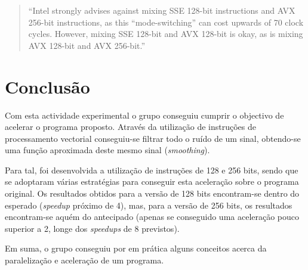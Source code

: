 \documentclass[a4paper]{article}
\begin{document}
	 \begin{quote}
	  ``Intel strongly advises against mixing SSE 128-bit instructions and AVX 256-bit instructions, as this ``mode-switching'' can cost upwards of 70 clock cycles. However, mixing SSE 128-bit and AVX 128-bit is okay, as is mixing AVX 128-bit and AVX 256-bit.''
	 \end{quote}
	   

	
	\section{Conclusão}

	Com esta actividade experimental o grupo conseguiu cumprir o objectivo de acelerar o programa proposto. Através da utilização de instruções de processamento vectorial conseguiu-se filtrar todo o ruído de um sinal, obtendo-se uma função aproximada deste mesmo sinal (\textit{smoothing}).
	
	Para tal, foi desenvolvida a utilização de instruções de 128 e 256 bits, sendo que se adoptaram várias estratégias para conseguir esta aceleração sobre o programa original. Os resultados obtidos para a versão de 128 bits encontram-se dentro do esperado (\textit{speedup} próximo de 4), mas, para a versão de 256 bits, os resultados encontram-se aquém do antecipado (apenas se conseguido uma aceleração pouco superior a 2, longe dos \textit{speedups} de 8 previstos).
	
	Em suma, o grupo conseguiu por em prática alguns conceitos acerca da paralelização e aceleração de um programa.
\end{document}
